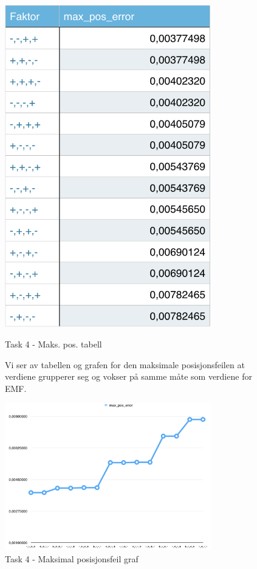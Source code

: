 \begin{figure}
	\begin{minipage}{.5\textwidth}
		\centering
		\includegraphics[width=0.8\textwidth]{sections/Exercise4/task4max_pos_error.png}
	    	\caption{Task 4 - Maks. pos. tabell}
	    	\label{fig:task4max_pos_error}
	\end{minipage}
	\vspace{20 mm}
	\begin{minipage}{.5\textwidth}
		Vi ser av tabellen og grafen for den maksimale posisjonsfeilen at verdiene grupperer seg og vokser på samme måte som verdiene for EMF. 
	\end{minipage}

	\centering
	\includegraphics[width=0.8\textwidth]{sections/Exercise4/task4max_pos_error_graph.png}
	    \caption{Task 4 - Maksimal posisjonsfeil graf}
	    \label{fig:task4max_pos_error_graph}
\end{figure}
